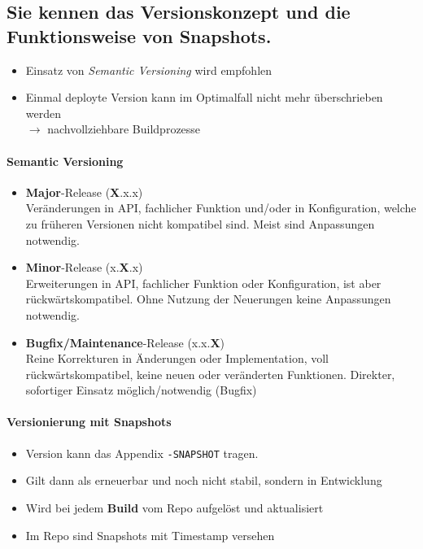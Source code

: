 \documentclass[a4paper]{article}
\begin{document}
	\subsection{Sie kennen das Versionskonzept und die Funktionsweise von Snapshots.}
	
	\begin{itemize}
		\item Einsatz von \textit{Semantic Versioning} wird empfohlen
		\item Einmal deployte Version kann im Optimalfall nicht mehr überschrieben werden\\
				$\rightarrow$ nachvollziehbare Buildprozesse
	\end{itemize}

			\paragraph{Semantic Versioning}
			
			\begin{itemize}
				\item \textbf{Major}-Release (\textbf{X}.x.x)\\
						Veränderungen in API, fachlicher Funktion und/oder in Konfiguration, welche zu früheren Versionen nicht kompatibel sind.
						Meist sind Anpassungen notwendig.
						
				\item \textbf{Minor}-Release (x.\textbf{X}.x)\\
						Erweiterungen in API, fachlicher Funktion oder Konfiguration, ist aber rückwärtskompatibel.
						Ohne Nutzung der Neuerungen keine Anpassungen notwendig.
						
				\item \textbf{Bugfix/Maintenance}-Release (x.x.\textbf{X})\\
						Reine Korrekturen in Änderungen oder Implementation, voll rückwärtskompatibel, keine neuen oder veränderten Funktionen.
						Direkter, sofortiger Einsatz möglich/notwendig (Bugfix)
			\end{itemize}
		
			\paragraph{Versionierung mit Snapshots}
			
			\begin{itemize}
				\item Version kann das Appendix \texttt{-SNAPSHOT} tragen.
				\item Gilt dann als erneuerbar und noch nicht stabil, sondern in Entwicklung
				\item Wird bei jedem \textbf{Build} vom Repo aufgelöst und aktualisiert
				\item Im Repo sind Snapshots mit Timestamp versehen
			\end{itemize}
	
\end{document}
